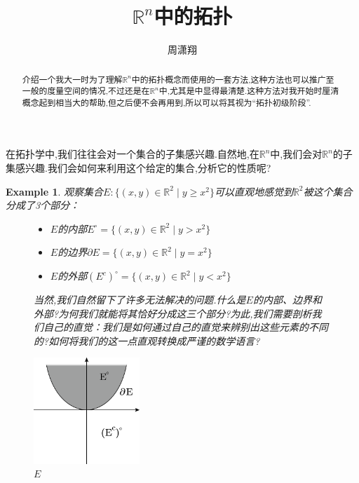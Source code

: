 \documentclass[12pt,A4paper,oneside]{amsart}
\numberwithin{equation}{section}
\theoremstyle{plain}
\newtheorem{example}[theorem]{Example}
\theoremstyle{plain}
\theoremstyle{plain}
\numberwithin{equation}{section}
\theoremstyle{remark}
\begin{document}
\title[]{\LARGE $\mathbb{R}^n$中的拓扑}


\author[]{\large 周潇翔}
\address{School of Mathematical Sciences\\
University of Science and Technology of China\\
Hefei, 230026\\ P.R. China\\}
\maketitle




\begin{abstract}
介绍一个我大一时为了理解$\mathbb{R}^n$中的拓扑概念而使用的一套方法,这种方法也可以推广至一般的度量空间的情况,不过还是在$\mathbb{R}^n$中,尤其是中显得最清楚.这种方法对我开始时厘清概念起到相当大的帮助,但之后便不会再用到,所以可以将其视为“拓扑初级阶段”.
\end{abstract}





在拓扑学中,我们往往会对一个集合的子集感兴趣.自然地,在$\mathbb{R}^n$中,我们会对$\mathbb{R}^n$的子集感兴趣.我们会如何来利用这个给定的集合,分析它的性质呢?

\begin{example}\label{ex1}
	观察集合$E:\{(x,y) \in \mathbb{R}^2\mid y\geqslant x^2\}$可以直观地感觉到$\mathbb{R}^2$被这个集合分成了3个部分：
\begin{figure}[ht]
	\begin{minipage}[b]{.60\textwidth}

			\begin{itemize}
				\item $E$的内部$E^{\circ}=\{(x,y) \in \mathbb{R}^2\mid y> x^2\}$
				\item $E$的边界$\partial E=\{(x,y) \in \mathbb{R}^2\mid y= x^2\}$
				\item $E$的外部$(E^c)^{\circ}=\{(x,y) \in \mathbb{R}^2\mid y< x^2\}$
			\end{itemize}	
当然,我们自然留下了许多无法解决的问题.什么是$E$的内部、边界和外部?为何我们就能将其恰好分成这三个部分?为此,我们需要剖析我们自己的直觉：我们是如何通过自己的直觉来辨别出这些元素的不同的?如何将我们的这一点直观转换成严谨的数学语言?
	\end{minipage}
	\begin{minipage}[b]{.38\textwidth}
		\centering
		\includegraphics[width=4cm]{figures/figure2.png}
		\caption{$E$}
	\end{minipage}

\end{figure}	
\end{example}
\end{document}
